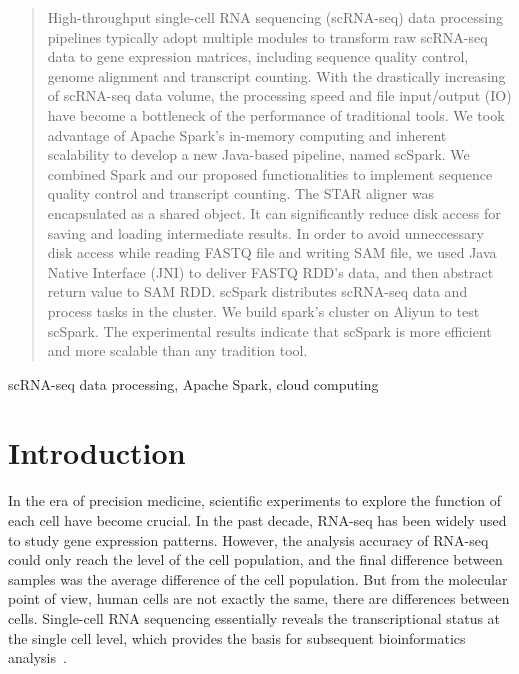 \documentclass[conference]{IEEEtran}
\begin{document}
\begin{abstract}
High-throughput single-cell RNA sequencing (scRNA-seq) data processing pipelines typically adopt multiple modules to transform raw scRNA-seq data to gene expression matrices, including sequence quality control, genome alignment and transcript counting. 
With the drastically increasing of scRNA-seq data volume, the processing speed and file input/output (IO) have become a bottleneck of the performance of traditional tools. 
We took advantage of Apache Spark's in-memory computing and inherent scalability to develop a new Java-based pipeline, named scSpark. 
We combined Spark and our proposed functionalities to implement sequence quality control and transcript counting. 
The STAR aligner was encapsulated as a shared object. %
It can significantly reduce disk access for saving and loading intermediate results. 
In order to avoid unneccessary disk access while reading FASTQ file and writing SAM file, we used Java Native Interface (JNI) to deliver FASTQ RDD's data, and then abstract return value to SAM RDD. 
scSpark distributes scRNA-seq data and process tasks in the cluster. 
We build spark's cluster on Aliyun to test scSpark. 
The experimental results indicate that scSpark is more efficient and more scalable than any tradition tool. 
\end{abstract}

\begin{IEEEkeywords}
scRNA-seq data processing, Apache Spark, cloud computing
\end{IEEEkeywords}

\section{Introduction}
In the era of precision medicine, scientific experiments to explore the function of each cell have become crucial. 
In the past decade, RNA-seq has been widely used to study gene expression patterns. 
However, the analysis accuracy of RNA-seq could only reach the level of the cell population, and the final difference between samples was the average difference of the cell population. 
But from the molecular point of view, human cells are not exactly the same, there are differences between cells. 
Single-cell RNA sequencing essentially reveals the transcriptional status at the single cell level, which provides the basis for subsequent bioinformatics analysis~\cite{Papalexi2018SinglecellRS}. 
\end{document}
